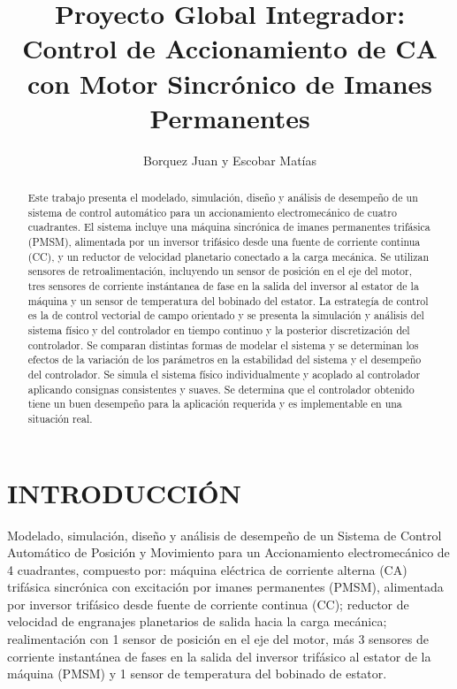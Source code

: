 \documentclass[a4paper, 10pt, onecolumn,journal]{ieeeconf}
\title{\LARGE \bf
Proyecto Global Integrador: Control de Accionamiento de CA con
Motor Sincrónico de Imanes Permanentes
}
\author{Borquez Juan y Escobar Matías}
\begin{document}
\maketitle
\thispagestyle{empty}
\pagestyle{fancy}

\begin{abstract}
	Este trabajo presenta el modelado, simulación, diseño y análisis de desempeño de un sistema de control automático para un accionamiento electromecánico de cuatro cuadrantes. El sistema incluye una máquina sincrónica de imanes permanentes trifásica (PMSM), alimentada por un inversor trifásico desde una fuente de corriente continua (CC), y un reductor de velocidad planetario conectado a la carga mecánica. Se utilizan sensores de retroalimentación, incluyendo un sensor de posición en el eje del motor, tres sensores de corriente instántanea de fase en la salida del inversor al estator de la máquina y un sensor de temperatura del bobinado del estator.
	La estrategía de control es la de control vectorial de campo orientado y se presenta la simulación y análisis del sistema físico y del controlador en tiempo continuo y la posterior discretización del controlador.
	Se comparan distintas formas de modelar el sistema y se determinan los efectos de la variación de los parámetros en la estabilidad del sistema y el desempeño del controlador. Se simula el sistema físico individualmente y acoplado al controlador aplicando consignas consistentes y suaves.
	Se determina que el controlador obtenido tiene un buen desempeño para la aplicación requerida y es implementable en una situación real.
\end{abstract}

\section{INTRODUCCIÓN}
Modelado, simulación, diseño y análisis de desempeño de un Sistema de Control Automático de Posición y Movimiento para un Accionamiento electromecánico de 4 cuadrantes, compuesto por: máquina eléctrica de corriente alterna (CA) trifásica sincrónica con excitación por imanes permanentes (PMSM), alimentada por inversor trifásico desde fuente de corriente continua (CC); reductor de velocidad de engranajes planetarios de salida hacia la carga mecánica; realimentación con 1 sensor de posición en el eje del motor, más 3 sensores de corriente instantánea de fases en la salida del inversor trifásico al estator de la máquina (PMSM) y 1 sensor de temperatura del bobinado de estator.
\end{document}
